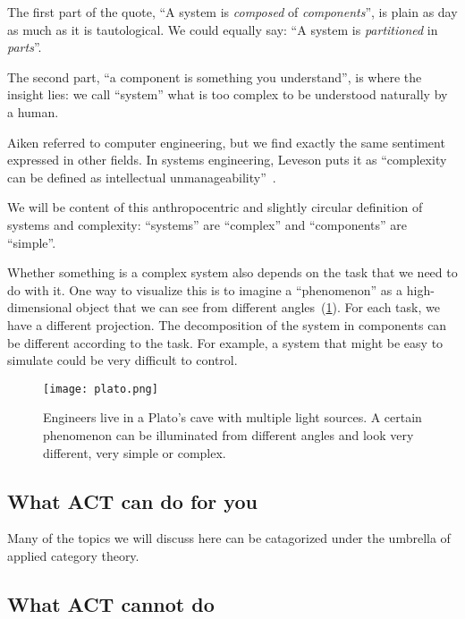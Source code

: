 The first part of the quote, ``A system is \emph{composed} of \emph{components}'', is plain as day as much as it is tautological. We could equally say: ``A system is \emph{partitioned} in \emph{parts}''.

The second part, ``a component is something you understand'', is where the insight lies: we call ``system'' what is too complex to be understood naturally by a human.

Aiken referred to computer engineering, but we find exactly the same sentiment expressed in other fields. In systems engineering, Leveson puts it as ``complexity can be defined as intellectual unmanageability''~\cite{leveson12engineering}.

We will be content of this anthropocentric and slightly circular definition of systems and
complexity: ``systems'' are ``complex'' and ``components'' are ``simple''.

Whether something is a complex system also depends on the task that we need to do with it. One
way to visualize this is to imagine a ``phenomenon'' as a high-dimensional object that we can see
from different angles~(\cref{fig:aspects}).
For each task, we have a different
projection. The decomposition of the system in components can be different according to the
task. For example, a system that might be easy to simulate could be very difficult to control.

\begin{figure}[h]
  \centering
  \texttt{[image: plato.png]}
  \caption{
    Engineers live in a Plato's cave with multiple light sources.
    A certain phenomenon can be illuminated from different angles
    and look very different, very simple or complex.
  }
  \label{fig:aspects}
\end{figure}


\subsection{What ACT can do for you}

Many of the topics we will discuss here can be catagorized under the umbrella
of applied category theory.


\subsection{What ACT cannot do}

